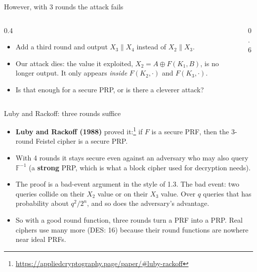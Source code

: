 \ifdefined\PRESENTATION\else\PassOptionsToClass{handout}{beamer}\fi\documentclass[aspectratio=169, lualatex]{beamer}
\begin{document}
\begin{frame}{However, with 3 rounds the attack fails}
	\begin{columns}[c]
		\begin{column}{0.4\textwidth}
			\begin{itemize}
				\item Add a third round and output $X_3\|X_4$ instead of $X_2\|X_3$.
				\item Our attack dies: the value it exploited, $X_2 = A \oplus F(K_1, B)$, is no longer output. It only appears \emph{inside} $F(K_2, \cdot)$ and $F(K_3, \cdot)$.
				\item Is that enough for a secure PRP, or is there a cleverer attack?
			\end{itemize}
		\end{column}
		\begin{column}{0.6\textwidth}
			\begin{center}
			\end{center}
		\end{column}
	\end{columns}
\end{frame}

\begin{frame}{Luby and Rackoff: three rounds suffice}
	\begin{itemize}[<+->]
		\item \textbf{Luby and Rackoff (1988)} proved it:\footnote{\url{https://appliedcryptography.page/paper/\#luby-rackoff}} if $F$ is a secure PRF, then the 3-round Feistel cipher is a secure PRP.
		\item With 4 rounds it stays secure even against an adversary who may also query $\mathbb{F}^{-1}$ (a \textbf{strong} PRP, which is what a block cipher used for decryption needs).
		\item The proof is a bad-event argument in the style of 1.3. The bad event: two queries collide on their $X_2$ value or on their $X_3$ value. Over $q$ queries that has probability about $q^2/2^n$, and so does the adversary's advantage.
		\item So with a good round function, three rounds turn a PRF into a PRP. Real ciphers use many more (DES: 16) because their round functions are nowhere near ideal PRFs.
	\end{itemize}
\end{frame}
\end{document}

